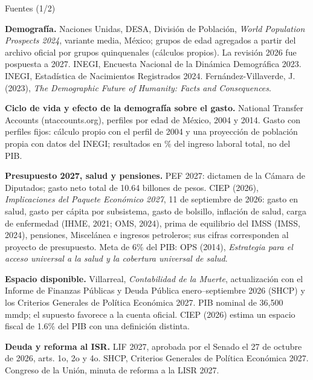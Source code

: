 \begin{frame}{Fuentes (1/2)}
  \vspace{0.2em}
  {\fontsize{6.6}{8.4}\selectfont\raggedright
  \textbf{Demografía.} Naciones Unidas, DESA, División de Población, \emph{World Population Prospects 2024}, variante media, México; grupos de edad agregados a partir del archivo oficial por grupos quinquenales (cálculos propios). La revisión 2026 fue pospuesta a 2027. INEGI, Encuesta Nacional de la Dinámica Demográfica 2023. INEGI, Estadística de Nacimientos Registrados 2024. Fernández-Villaverde, J. (2023), \emph{The Demographic Future of Humanity: Facts and Consequences}.\par\vspace{0.6em}
  \textbf{Ciclo de vida y efecto de la demografía sobre el gasto.} National Transfer Accounts (ntaccounts.org), perfiles por edad de México, 2004 y 2014. Gasto con perfiles fijos: cálculo propio con el perfil de 2004 y una proyección de población propia con datos del INEGI; resultados en \% del ingreso laboral total, no del PIB.\par\vspace{0.6em}
  \textbf{Presupuesto 2027, salud y pensiones.} PEF 2027: dictamen de la Cámara de Diputados; gasto neto total de 10.64 billones de pesos. CIEP (2026), \emph{Implicaciones del Paquete Económico 2027}, 11 de septiembre de 2026: gasto en salud, gasto per cápita por subsistema, gasto de bolsillo, inflación de salud, carga de enfermedad (IHME, 2021; OMS, 2024), prima de equilibrio del IMSS (IMSS, 2024), pensiones, Miscelánea e ingresos petroleros; sus cifras corresponden al proyecto de presupuesto. Meta de 6\% del PIB: OPS (2014), \emph{Estrategia para el acceso universal a la salud y la cobertura universal de salud}.\par\vspace{0.6em}
  \textbf{Espacio disponible.} Villarreal, \emph{Contabilidad de la Muerte}, actualización con el Informe de Finanzas Públicas y Deuda Pública enero--septiembre 2026 (SHCP) y los Criterios Generales de Política Económica 2027. PIB nominal de 36,500 mmdp; el supuesto favorece a la cuenta oficial. CIEP (2026) estima un espacio fiscal de 1.6\% del PIB con una definición distinta.\par\vspace{0.6em}
  \textbf{Deuda y reforma al ISR.} LIF 2027, aprobada por el Senado el 27 de octubre de 2026, arts. 1o, 2o y 4o. SHCP, Criterios Generales de Política Económica 2027. Congreso de la Unión, minuta de reforma a la LISR 2027.\par}
\end{frame}

